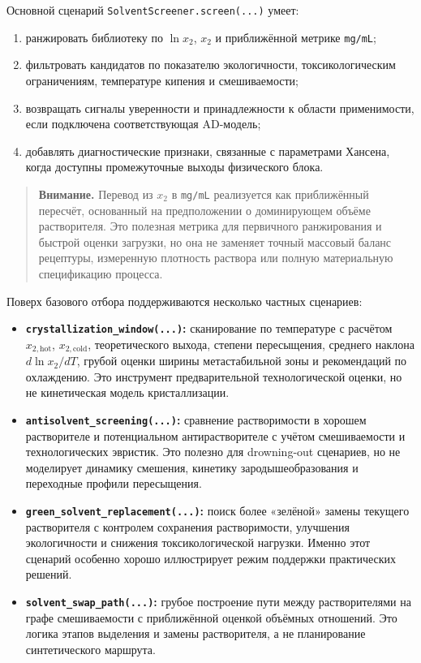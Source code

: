 \documentclass[11pt]{article}
\newcommand{\warnnote}[1]{\begin{quote}\textbf{Внимание.} #1\end{quote}}
\begin{document}
Основной сценарий \texttt{SolventScreener.screen(...)} умеет:
\begin{enumerate}
  \item ранжировать библиотеку по $\ln x_2$, $x_2$ и приближённой метрике \texttt{mg/mL};
  \item фильтровать кандидатов по показателю экологичности, токсикологическим ограничениям, температуре кипения и смешиваемости;
  \item возвращать сигналы уверенности и принадлежности к области применимости, если подключена соответствующая AD-модель;
  \item добавлять диагностические признаки, связанные с параметрами Хансена, когда доступны промежуточные выходы физического блока.
\end{enumerate}

\warnnote{Перевод из $x_2$ в \texttt{mg/mL} реализуется как приближённый пересчёт, основанный на предположении о доминирующем объёме растворителя. Это полезная метрика для первичного ранжирования и быстрой оценки загрузки, но она не заменяет точный массовый баланс рецептуры, измеренную плотность раствора или полную материальную спецификацию процесса.}

Поверх базового отбора поддерживаются несколько частных сценариев:
\begin{itemize}
  \item \textbf{\texttt{crystallization\_window(...)}:} сканирование по температуре с расчётом $x_{2,\mathrm{hot}}$, $x_{2,\mathrm{cold}}$, теоретического выхода, степени пересыщения, среднего наклона $d\ln x_2/dT$, грубой оценки ширины метастабильной зоны и рекомендаций по охлаждению. Это инструмент предварительной технологической оценки, но не кинетическая модель кристаллизации.
  \item \textbf{\texttt{antisolvent\_screening(...)}:} сравнение растворимости в хорошем растворителе и потенциальном антирастворителе с учётом смешиваемости и технологических эвристик. Это полезно для drowning-out сценариев, но не моделирует динамику смешения, кинетику зародышеобразования и переходные профили пересыщения.
  \item \textbf{\texttt{green\_solvent\_replacement(...)}:} поиск более «зелёной» замены текущего растворителя с контролем сохранения растворимости, улучшения экологичности и снижения токсикологической нагрузки. Именно этот сценарий особенно хорошо иллюстрирует режим поддержки практических решений.
  \item \textbf{\texttt{solvent\_swap\_path(...)}:} грубое построение пути между растворителями на графе смешиваемости с приближённой оценкой объёмных отношений. Это логика этапов выделения и замены растворителя, а не планирование синтетического маршрута.
\end{itemize}
\end{document}
